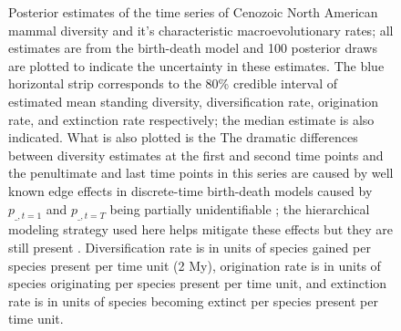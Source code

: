 \begin{figure}[p]
  \caption[Estimated mammal log-diversity and macroevolutionary rates for the Cenozoic]{Posterior estimates of the time series of Cenozoic North American mammal diversity and it's characteristic macroevolutionary rates; all estimates are from the birth-death model and 100 posterior draws are plotted to indicate the uncertainty in these estimates. The blue horizontal strip corresponds to the 80\% credible interval of estimated mean standing diversity, diversification rate, origination rate, and extinction rate respectively; the median estimate is also indicated. What is also plotted is the  The dramatic differences between diversity estimates at the first and second time points and the penultimate and last time points in this series are caused by well known edge effects in discrete-time birth-death models caused by \(p_{\_, t = 1}\) and \(p_{\_, t = T}\) being partially unidentifiable \citep{Royle2008}; the hierarchical modeling strategy used here helps mitigate these effects but they are still present \citep{Gelman2013d,Royle2008}. Diversification rate is in units of species gained per species present per time unit (2 My), origination rate is in units of species originating per species present per time unit, and extinction rate is in units of species becoming extinct per species present per time unit.}
  \label{fig:macro_values}
\end{figure}


